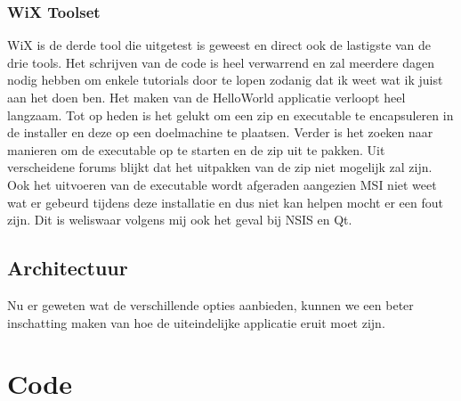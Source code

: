 \documentclass{article}
\begin{document}
\subsubsection{WiX Toolset}
WiX is de derde tool die uitgetest is geweest en direct ook de lastigste van de drie tools.
Het schrijven van de code is heel verwarrend en zal meerdere dagen nodig hebben om enkele tutorials door te lopen zodanig dat ik weet wat ik juist aan het doen ben.
Het maken van de HelloWorld applicatie verloopt heel langzaam.
Tot op heden is het gelukt om een zip en executable te encapsuleren in de installer en deze op een doelmachine te plaatsen.
Verder is het zoeken naar manieren om de executable op te starten en de zip uit te pakken.
Uit verscheidene forums blijkt dat het uitpakken van de zip niet mogelijk zal zijn.
Ook het uitvoeren van de executable wordt afgeraden aangezien MSI niet weet wat er gebeurd tijdens deze installatie en dus niet kan helpen mocht er een fout zijn.
Dit is weliswaar volgens mij ook het geval bij NSIS en Qt.

\subsection{Architectuur}
Nu er geweten wat de verschillende opties aanbieden, kunnen we een beter inschatting maken van hoe de uiteindelijke applicatie eruit moet zijn.

\section{Code}\label{section:code}













%

\end{document}
